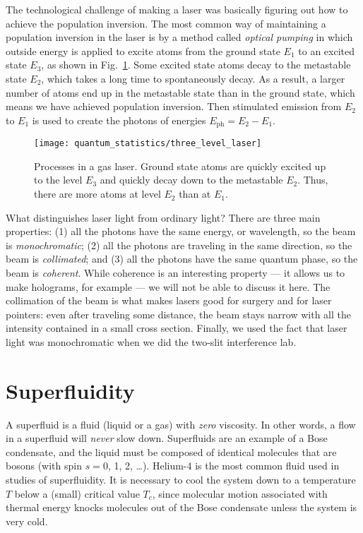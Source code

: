 The technological challenge of making a laser was basically figuring
out how to achieve the population inversion.  The most common way of
maintaining a population inversion in the laser is by a method called
{\it optical pumping} in which outside energy is applied to excite
atoms from the ground state $E_1$ to an excited state $E_3$, as shown
in Fig.~\ref{fig:three_level_laser}.  Some excited state atoms decay
to the metastable state $E_2$, which takes a long time to
spontaneously decay.  As a result, a larger number of atoms end up in
the metastable state than in the ground state, which means we have
achieved population inversion.  Then stimulated emission from $E_2$ to
$E_1$ is used to create the photons of energies $E_\text{ph}=E_2 -
E_1$.

\begin{figure}
\begin{center}
\texttt{[image: quantum\_statistics/three\_level\_laser]}
\caption{Processes in a gas laser.  Ground state atoms are quickly
  excited up to the level $E_3$ and quickly decay down to the
  metastable $E_2$.  Thus, there are more atoms at level $E_2$ than at
  $E_1$.}
\label{fig:three_level_laser}
\end{center}
\end{figure}

What distinguishes laser light from ordinary light?  There are three
main properties: (1) all the photons have the same energy, or
wavelength, so the beam is \textit{monochromatic}; (2) all the photons
are traveling in the same direction, so the beam is
\textit{collimated}; and (3) all the photons have the same quantum
phase, so the beam is \textit{coherent}.  While coherence is an
interesting property --- it allows us to make holograms, for example
--- we will not be able to discuss it here.  The collimation of the
beam is what makes lasers good for surgery and for laser pointers:
even after traveling some distance, the beam stays narrow with all
the intensity contained in a small cross section.  Finally, we used the fact
that laser light was monochromatic when we did the two-slit interference
lab.

\section{Superfluidity}
\label{sec:superfluidity}

A superfluid is a fluid (liquid or a gas) with {\em zero} viscosity.
In other words, a flow in a superfluid will {\em never} slow down.
Superfluids are an example of a Bose condensate, and the liquid must
be composed of identical molecules that are bosons (with spin $s = 0$,
1, 2, \dots).  Helium-4 is the most common fluid used in studies of
superfluidity.  It is necessary to cool the system down to a
temperature $T$ below a (small) critical value $T_c$, since molecular
motion associated with thermal energy knocks molecules out of the Bose
condensate unless the system is very cold.

